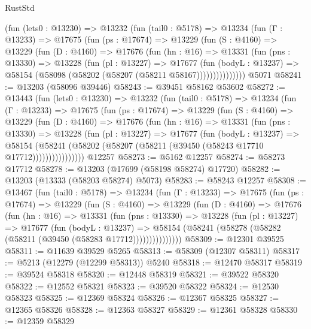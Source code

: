 \begin{lexlean}{RustStd}
\begin{coremodule}
      (fun (lets0 : @13230) =>
      @13232
        (fun (tail0 : @5178) =>
        @13234
          (fun (Γ : @13233) =>
          @17675
            (fun (ps : @17674) =>
            @13229
              (fun (S : @4160) =>
              @13229
                (fun (D : @4160) =>
                @17676
                  (fun (hn : @16) =>
                  @13331
                    (fun (pns : @13330) =>
                    @13228
                      (fun (pl : @13227) =>
                      @17677
                        (fun (bodyL : @13237) =>
                        @58154 (@58098 (@58202 (@58207 (@58211 @58167)))))))))))))))
    @5071
@58241 := @13203 (@58096 @39446)
@58243 := @39451 @58162 @53602
@58272 := @13443
    (fun (lets0 : @13230) =>
    @13232
      (fun (tail0 : @5178) =>
      @13234
        (fun (Γ : @13233) =>
        @17675
          (fun (ps : @17674) =>
          @13229
            (fun (S : @4160) =>
            @13229
              (fun (D : @4160) =>
              @17676
                (fun (hn : @16) =>
                @13331
                  (fun (pns : @13330) =>
                  @13228
                    (fun (pl : @13227) =>
                    @17677
                      (fun (bodyL : @13237) =>
                      @58154
                        (@58241
                          (@58202 (@58207 (@58211 (@39450 (@58243 @17710 @17712))))))))))))))))
    @12257
@58273 := @5162 @12257
@58274 := @58273 @17712
@58278 := @13203 (@17699 (@58198 @58274) @17720)
@58282 := @13203 (@13333 (@58203 @58274) @5073)
@58283 := @58243 @12257
@58308 := @13467
    (fun (tail0 : @5178) =>
    @13234
      (fun (Γ : @13233) =>
      @17675
        (fun (ps : @17674) =>
        @13229
          (fun (S : @4160) =>
          @13229
            (fun (D : @4160) =>
            @17676
              (fun (hn : @16) =>
              @13331
                (fun (pns : @13330) =>
                @13228
                  (fun (pl : @13227) =>
                  @17677
                    (fun (bodyL : @13237) =>
                    @58154 (@58241 (@58278 (@58282 (@58211 (@39450 (@58283 @17712)))))))))))))))
@58309 := @12301 @39525
@58311 := @11639 @39529 @5265
@58313 := @58309 (@12307 @58311)
@58317 := @5213 (@12279 (@12299 @58313)) @5240
@58318 := @12470 @58317
@58319 := @39524 @58318
@58320 := @12448 @58319
@58321 := @39522 @58320
@58322 := @12552 @58321
@58323 := @39520 @58322
@58324 := @12530 @58323
@58325 := @12369 @58324
@58326 := @12367 @58325
@58327 := @12365 @58326
@58328 := @12363 @58327
@58329 := @12361 @58328
@58330 := @12359 @58329

\end{coremodule}
\end{lexlean}
